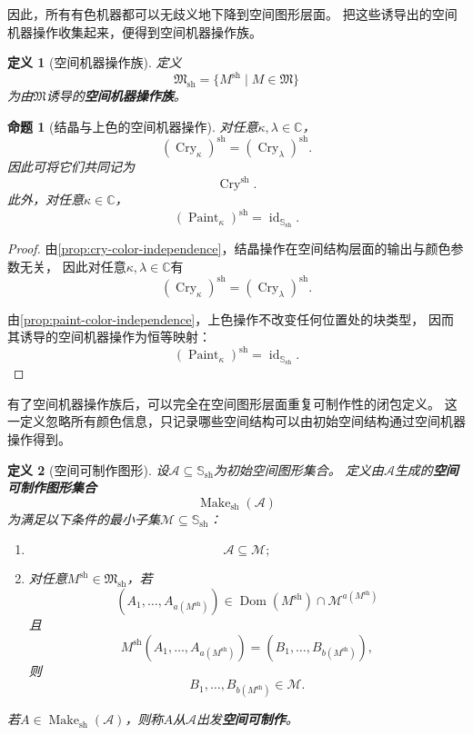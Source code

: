 \documentclass[UTF8,fontset=none]{ctexart}
\theoremstyle{cnthm}
\newtheorem{definition}{定义}[section]
\newtheorem{proposition}{命题}[section]
\begin{document}
			因此，所有有色机器都可以无歧义地下降到空间图形层面。
			把这些诱导出的空间机器操作收集起来，便得到空间机器操作族。
			
			\begin{definition}[空间机器操作族]
				定义
				$$
				\mathfrak{M}_{\mathrm{sh}}
				=
				\{M^{\mathrm{sh}}\mid M\in\mathfrak{M}\}
				$$
				为由$\mathfrak{M}$诱导的\textbf{空间机器操作族}。
			\end{definition}
			
			\begin{proposition}[结晶与上色的空间机器操作]
				对任意$\kappa,\lambda\in\mathbb{C}$，
				$$
				(\operatorname{Cry}_{\kappa})^{\mathrm{sh}}
				=
				(\operatorname{Cry}_{\lambda})^{\mathrm{sh}}.
				$$
				因此可将它们共同记为
				$$
				\operatorname{Cry}^{\mathrm{sh}}.
				$$
				此外，对任意$\kappa\in\mathbb{C}$，
				$$
				(\operatorname{Paint}_{\kappa})^{\mathrm{sh}}
				=
				\operatorname{id}_{\mathbb{S}_{\mathrm{sh}}}.
				$$
			\end{proposition}
			
			\begin{proof}
				由\cref{prop:cry-color-independence}，结晶操作在空间结构层面的输出与颜色参数无关，
				因此对任意$\kappa,\lambda\in\mathbb{C}$有
				$$
				(\operatorname{Cry}_{\kappa})^{\mathrm{sh}}
				=
				(\operatorname{Cry}_{\lambda})^{\mathrm{sh}}.
				$$
				
				由\cref{prop:paint-color-independence}，上色操作不改变任何位置处的块类型，
				因而其诱导的空间机器操作为恒等映射：
				$$
				(\operatorname{Paint}_{\kappa})^{\mathrm{sh}}
				=
				\operatorname{id}_{\mathbb{S}_{\mathrm{sh}}}.
				$$
			\end{proof}
			
			有了空间机器操作族后，可以完全在空间图形层面重复可制作性的闭包定义。
			这一定义忽略所有颜色信息，只记录哪些空间结构可以由初始空间结构通过空间机器操作得到。
			
			\begin{definition}[空间可制作图形]
				设$\mathcal{A}\subseteq\mathbb{S}_{\mathrm{sh}}$为初始空间图形集合。
				定义由$\mathcal{A}$生成的\textbf{空间可制作图形集合}
				$$
				\operatorname{Make}_{\mathrm{sh}}(\mathcal{A})
				$$
				为满足以下条件的最小子集$\mathcal{M}\subseteq\mathbb{S}_{\mathrm{sh}}$：
				\begin{enumerate}
					\item
					$$
					\mathcal{A}\subseteq\mathcal{M};
					$$
					
					\item 对任意$M^{\mathrm{sh}}\in\mathfrak{M}_{\mathrm{sh}}$，若
					$$
					(A_1,\dots,A_{a(M^{\mathrm{sh}})})
					\in
					\operatorname{Dom}(M^{\mathrm{sh}})
					\cap
					\mathcal{M}^{a(M^{\mathrm{sh}})}
					$$
					且
					$$
					M^{\mathrm{sh}}(A_1,\dots,A_{a(M^{\mathrm{sh}})})
					=
					(B_1,\dots,B_{b(M^{\mathrm{sh}})}),
					$$
					则
					$$
					B_1,\dots,B_{b(M^{\mathrm{sh}})}\in\mathcal{M}.
					$$
				\end{enumerate}
				
				若$A\in\operatorname{Make}_{\mathrm{sh}}(\mathcal{A})$，则称$A$从$\mathcal{A}$出发\textbf{空间可制作}。
			\end{definition}
			
\end{document}
